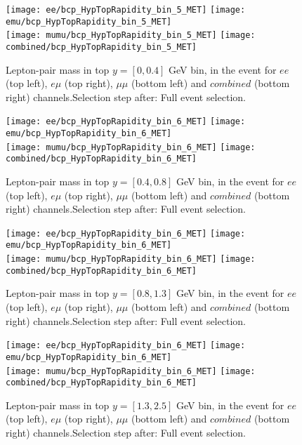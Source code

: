\clearpage
\newpage


\begin{figure}
  \texttt{[image: ee/bcp\_HypTopRapidity\_bin\_5\_MET]}
  \texttt{[image: emu/bcp\_HypTopRapidity\_bin\_5\_MET]}\\
  \texttt{[image: mumu/bcp\_HypTopRapidity\_bin\_5\_MET]}
  \texttt{[image: combined/bcp\_HypTopRapidity\_bin\_5\_MET]}
\caption{Lepton-pair mass in top $y = [0,0.4]$ GeV bin, in the event for $ee$ (top left), $e\mu$ (top right), $\mu\mu$ (bottom left) and $combined$ (bottom right) channels.\newline Selection step after: Full event selection.}
\end{figure}

\clearpage
\newpage

\begin{figure}
  \texttt{[image: ee/bcp\_HypTopRapidity\_bin\_6\_MET]}
  \texttt{[image: emu/bcp\_HypTopRapidity\_bin\_6\_MET]}\\
  \texttt{[image: mumu/bcp\_HypTopRapidity\_bin\_6\_MET]}
  \texttt{[image: combined/bcp\_HypTopRapidity\_bin\_6\_MET]}
\caption{Lepton-pair mass in top $y = [0.4,0.8]$ GeV bin, in the event for $ee$ (top left), $e\mu$ (top right), $\mu\mu$ (bottom left) and $combined$ (bottom right) channels.\newline Selection step after: Full event selection.}
\end{figure}

\clearpage
\newpage
\begin{figure}
  \texttt{[image: ee/bcp\_HypTopRapidity\_bin\_6\_MET]}
  \texttt{[image: emu/bcp\_HypTopRapidity\_bin\_6\_MET]}\\
  \texttt{[image: mumu/bcp\_HypTopRapidity\_bin\_6\_MET]}
  \texttt{[image: combined/bcp\_HypTopRapidity\_bin\_6\_MET]}
\caption{Lepton-pair mass in top $y = [0.8,1.3]$ GeV bin, in the event for $ee$ (top left), $e\mu$ (top right), $\mu\mu$ (bottom left) and $combined$ (bottom right) channels.\newline Selection step after: Full event selection.}
\end{figure}

\clearpage
\newpage
\begin{figure}
  \texttt{[image: ee/bcp\_HypTopRapidity\_bin\_6\_MET]}
  \texttt{[image: emu/bcp\_HypTopRapidity\_bin\_6\_MET]}\\
  \texttt{[image: mumu/bcp\_HypTopRapidity\_bin\_6\_MET]}
  \texttt{[image: combined/bcp\_HypTopRapidity\_bin\_6\_MET]}
\caption{Lepton-pair mass in top $y = [1.3,2.5]$ GeV bin, in the event for $ee$ (top left), $e\mu$ (top right), $\mu\mu$ (bottom left) and $combined$ (bottom right) channels.\newline Selection step after: Full event selection.}
\end{figure}

